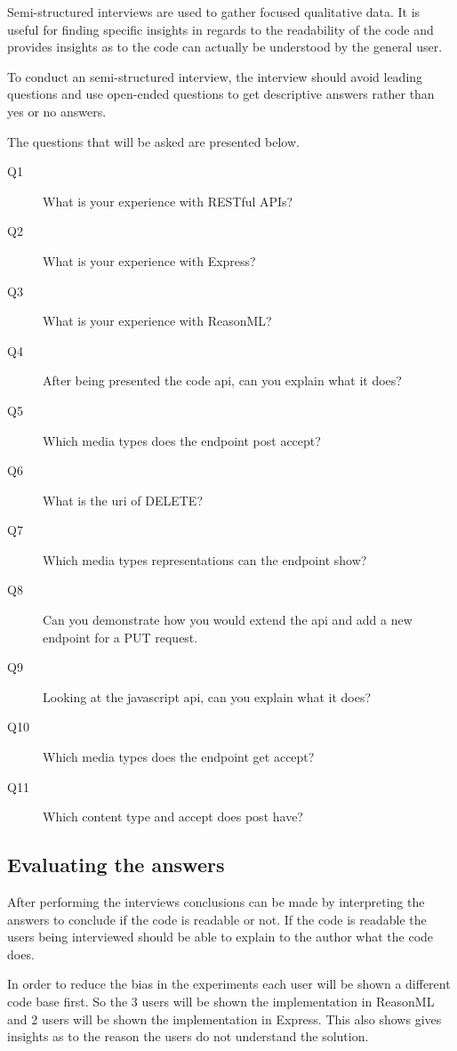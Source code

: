 Semi-structured interviews are used to gather focused qualitative data. It is
useful for finding specific insights in regards to the readability of the code
and provides insights as to the code can actually be understood by the general
user.

To conduct an semi-structured interview, the interview should avoid leading
questions and use open-ended questions to get descriptive answers rather than
yes or no answers. 

The questions that will be asked are presented below.

\begin{description}
    \item[Q1] What is your experience with RESTful APIs?
    \item[Q2] What is your experience with Express?
    \item[Q3] What is your experience with ReasonML?
    \item[Q4] After being presented the code api, can you explain what it does?
    \item[Q5] Which media types does the endpoint post accept?
    \item[Q6] What is the uri of DELETE?
    \item[Q7] Which media types representations can the endpoint show?
    \item[Q8] Can you demonstrate how you would extend the api and add a new endpoint
    for a PUT request.
    \item[Q9] Looking at the javascript api, can you explain what it does?
    \item[Q10] Which media types does the endpoint get accept?
    \item[Q11] Which content type and accept does post have?
\end{description}

\subsection{Evaluating the answers}

After performing the interviews conclusions can be made by interpreting the
answers to conclude if the code is readable or not. If the code is readable the
users being interviewed should be able to explain to the author what the code
does.

In order to reduce the bias in the experiments each user will be shown a
different code base first. So the 3 users will be shown the implementation in
ReasonML and 2 users will be shown the implementation in Express. This also
shows gives insights as to the reason the users do not understand the solution.

